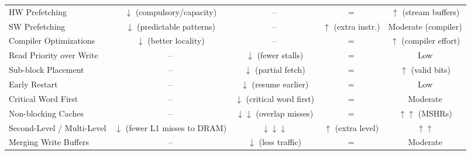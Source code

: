 \begin{landscape}
\begin{table}[p]
\begin{adjustbox}{max width=\linewidth,center}
\begin{tabular}{@{} l c c c c @{}}
            HW Prefetching                          & $\downarrow$ (compulsory/capacity)        & --                                        & $=$                                           & $\uparrow$ (stream buffers)   \\ [.3em]
            SW Prefetching                          & $\downarrow$ (predictable patterns)       & --                                        & $\uparrow$ (extra instr.)                     & Moderate (compiler)           \\ [.3em]
            Compiler Optimizations                  & $\downarrow$ (better locality)            & --                                        & $=$                                           & $\uparrow$ (compiler effort)  \\ [.3em]
            Read Priority over Write                & --                                        & $\downarrow$ (fewer stalls)               & $=$                                           & Low                           \\ [.3em]
            Sub-block Placement                     & --                                        & $\downarrow$ (partial fetch)              & $=$                                           & $\uparrow$ (valid bits)       \\ [.3em]
            Early Restart                           & --                                        & $\downarrow$ (resume earlier)             & $=$                                           & Low                           \\ [.3em]
            Critical Word First                     & --                                        & $\downarrow$ (critical word first)        & $=$                                           & Moderate                      \\ [.3em]
            Non-blocking Caches                     & --                                        & $\downarrow\downarrow$ (overlap misses)   & $=$                                           & $\uparrow\uparrow$ (MSHRs)    \\ [.3em]
            Second-Level / Multi-Level              & $\downarrow$ (fewer L1 misses to DRAM)    & $\downarrow\downarrow\downarrow$          & $\uparrow$ (extra level)                      & $\uparrow\uparrow$            \\ [.3em]
            Merging Write Buffers                   & --                                        & $\downarrow$ (less traffic)               & $=$                                           & Moderate                      \\ [.3em]

\end{tabular}
\end{adjustbox}
\end{table}
\end{landscape}
